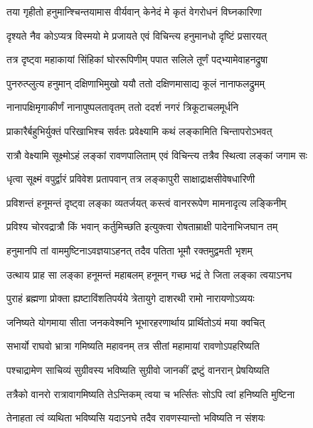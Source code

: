 \twolineshloka
{तया गृहीतो हनुमान्श्चिन्तयामास वीर्यवान्}
{केनेदं मे कृतं वेगरोधनं विघ्नकारिणा} %

\twolineshloka
{दृश्यते नैव कोऽप्यत्र विस्मयो मे प्रजायते}
{एवं विचिन्त्य हनुमानधो दृष्टिं प्रसारयत्} %

\twolineshloka
{तत्र दृष्ट्वा महाकायां सिंहिकां घोररूपिणीम्}
{पपात सलिले तूर्णं पद्भ्यामेवाहनद्रुषा} %

\twolineshloka
{पुनरुत्प्लुत्य हनुमान् दक्षिणाभिमुखो ययौ}
{ततो दक्षिणमासाद्य कूलं नानाफलद्रुमम्} %

\twolineshloka
{नानापक्षिमृगाकीर्णं नानापुष्पलतावृतम्}
{ततो ददर्श नगरं त्रिकूटाचलमूर्धनि} %

\twolineshloka
{प्राकारैर्बहुभिर्युक्तं परिखाभिश्च सर्वतः}
{प्रवेक्ष्यामि कथं लङ्कामिति चिन्तापरोऽभवत्} %

\twolineshloka
{रात्रौ वेक्ष्यामि सूक्ष्मोऽहं लङ्कां रावणपालिताम्}
{एवं विचिन्त्य तत्रैव स्थित्वा लङ्कां जगाम सः} %

\twolineshloka
{धृत्वा सूक्ष्मं वपुर्द्वारं प्रविवेश प्रतापवान्}
{तत्र लङ्कापुरी साक्षाद्राक्षसीवेषधारिणी} %

\twolineshloka
{प्रविशन्तं हनूमन्तं दृष्ट्वा लङ्का व्यतर्जयत्}
{कस्त्वं वानररूपेण मामनादृत्य लङ्किनीम्} %

\twolineshloka
{प्रविश्य चोरवद्रात्रौ किं भवान् कर्तुमिच्छति}
{इत्युक्त्वा रोषताम्राक्षी पादेनाभिजघान तम्} %

\twolineshloka
{हनुमानपि तां वाममुष्टिनाऽवज्ञयाऽहनत्}
{तदैव पतिता भूमौ रक्तमुद्वमती भृशम्} %

\twolineshloka
{उत्थाय प्राह सा लङ्का हनूमन्तं महाबलम्}
{हनूमन् गच्छ भद्रं ते जिता लङ्का त्वयाऽनघ} %

\twolineshloka
{पुराहं ब्रह्मणा प्रोक्ता ह्यष्टाविंशतिपर्यये}
{त्रेतायुगे दाशरथी रामो नारायणोऽव्ययः} %

\twolineshloka
{जनिष्यते योगमाया सीता जनकवेश्मनि}
{भूभारहरणार्थाय प्रार्थितोऽयं मया क्वचित्} %

\twolineshloka
{सभार्यो राघवो भ्रात्रा गमिष्यति महावनम्}
{तत्र सीतां महामायां रावणोऽपहरिष्यति} %

\twolineshloka
{पश्चाद्रामेण साचिव्यं सुग्रीवस्य भविष्यति}
{सुग्रीवो जानकीं द्रष्टुं वानरान् प्रेषयिष्यति} %

\twolineshloka
{तत्रैको वानरो रात्रावागमिष्यति तेऽन्तिकम्}
{त्वया च भर्त्सितः सोऽपि त्वां हनिष्यति मुष्टिना} %

\twolineshloka
{तेनाहता त्वं व्यथिता भविष्यसि यदाऽनघे}
{तदैव रावणस्यान्तो भविष्यति न संशयः} %

